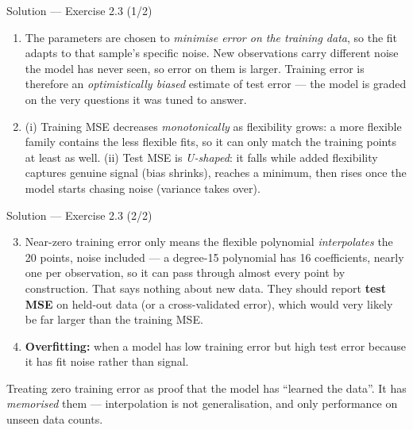 \documentclass[aspectratio=169,11pt]{beamer}
\begin{document}
\begin{frame}{Solution --- Exercise 2.3 (1/2)}
\begin{solutionbox}
\begin{enumerate}
  \item The parameters are chosen to \emph{minimise error on the
        training data}, so the fit adapts to that sample's specific
        noise. New observations carry different noise the model has
        never seen, so error on them is larger. Training error is
        therefore an \emph{optimistically biased} estimate of test
        error --- the model is graded on the very questions it was
        tuned to answer.
  \item (i) Training MSE decreases \emph{monotonically} as flexibility
        grows: a more flexible family contains the less flexible fits,
        so it can only match the training points at least as well.
        (ii) Test MSE is \emph{U-shaped}: it falls while added
        flexibility captures genuine signal (bias shrinks), reaches a
        minimum, then rises once the model starts chasing noise
        (variance takes over).
\end{enumerate}
\end{solutionbox}
\end{frame}

\begin{frame}{Solution --- Exercise 2.3 (2/2)}
\begin{solutionbox}
\begin{enumerate}\setcounter{enumi}{2}
  \item Near-zero training error only means the flexible polynomial
        \emph{interpolates} the 20 points, noise included --- a
        degree-15 polynomial has 16 coefficients, nearly one per
        observation, so it can pass through almost every point by
        construction. That says nothing about new data. They should
        report \textbf{test MSE} on held-out data (or a
        cross-validated error), which would very likely be far larger
        than the training MSE.
  \item \textbf{Overfitting:} when a model has low training error but
        high test error because it has fit noise rather than signal.
\end{enumerate}
\end{solutionbox}
\begin{mistake}
Treating zero training error as proof that
the model has ``learned the data''. It has \emph{memorised} them ---
interpolation is not generalisation, and only performance on unseen
data counts.
\end{mistake}
\end{frame}
\end{document}
